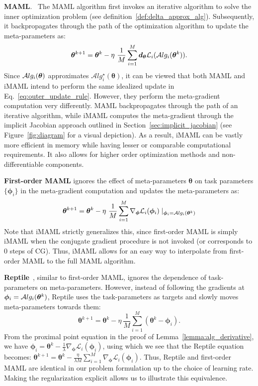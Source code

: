 \documentclass{article} \usepackage[nonatbib, final]{mod_neurips}
\newcommand{\param}{{\bm{\phi}}}               \newcommand{\paramspace}{\Phi}
\newcommand{\prior}{{\bm{\theta}}}               \newcommand{\priorspace}{\Theta}
\newcommand{\fn}{\mathcal{L}}                  \newcommand{\udfn}{\tilde{\fn}}        \newcommand{\fnht}{\hat{\fn}}        \newcommand{\ud}{\alg}
\newcommand{\algstar}{\mathcal{A}lg^\star}
\newcommand{\grad}{\bm{d}}
\newcommand{\pgrad}{\nabla}
\begin{document}
\textbf{MAML}. \ The MAML algorithm first invokes an iterative algorithm to solve the inner optimization problem (see definition~\ref{def:delta_approx_alg}). Subsequently, it backpropagates through the path of the optimization algorithm to update the meta-parameters as:
\[
\prior^{k+1} = \prior^k - \eta \ \frac{1}{M} \sum_{i=1}^M \grad_\prior \fn_i(\alg_i(\prior^k)).
\]
Since $\alg_i(\prior)$ approximates $\algstar_i(\prior)$, it can be viewed that both MAML and iMAML intend to perform the same idealized update in Eq.~\ref{eq:outer_update_rule}. However, they perform the meta-gradient computation very differently. MAML backpropagates through the path of an iterative algorithm, while iMAML computes the meta-gradient through the implicit Jacobian approach outlined in Section~\ref{sec:implicit_jacobian} (see Figure~\ref{fig:diagram} for a visual depiction). As a result, iMAML can be vastly more efficient in memory while having lesser or comparable computational requirements. It also allows for higher order optimization methods and non-differentiable components.

{\bf First-order MAML} ignores the effect of meta-parameters $\prior$ on task parameters $\{ \param_i \}$ in the meta-gradient computation and updates the meta-parameters as: 
$$\prior^{k+1} = \prior^k - \eta \ \frac{1}{M} \sum_{i=1}^M \pgrad_\param \fn_i (\param_i) \mid_{\param_i = \alg_i(\prior^k)}$$ 
Note that iMAML strictly generalizes this, since first-order MAML is simply iMAML when the conjugate gradient procedure is not invoked (or corresponds to 0 steps of CG). Thus, iMAML allows for an easy way to interpolate from first-order MAML to the full MAML algorithm.

{\bf Reptile}~\cite{nichol2018first}, similar to first-order MAML, ignores the dependence of task-parameters on meta-parameters. However, instead of following the gradients at $\param_i = \alg_i(\prior^k)$, Reptile uses the task-parameters as targets and slowly moves meta-parameters towards them: 
$$\prior^{k+1} = \prior^k - \eta \ \frac{1}{M} \sum_{i=1}^M (\prior^k - \param_i).$$ 
From the proximal point equation in the proof of Lemma~\ref{lemma:alg_derivative}, we have $\param_i = \prior^k - \frac{1}{\lambda} \pgrad_\param \fn_i(\param_i)$, using which we see that the Reptile equation becomes: \hbox{$\prior^{k+1}=\prior^k - \frac{\eta}{\lambda M} \sum_{i=1}^M \pgrad_\param \fn_i(\param_i)$}. Thus, Reptile and first-order MAML are identical in our problem formulation up to the choice of learning rate. Making the regularization explicit allows us to illustrate this equivalence. 
\end{document}
